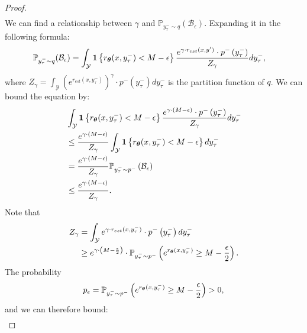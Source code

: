 \begin{proof}
\begin{equation*}
\begin{aligned}
\end{aligned}
\end{equation*}
We can find a relationship between $\gamma$ and $\mathbb{P}_{y^{-}_{\tau}\sim q}(\mathcal{B}_{\epsilon})$. Expanding it in the following formula:
\begin{equation*}
\begin{aligned}
&\mathbb{P}_{y^{-}_{\tau}\sim q}(\mathcal{B}_{\epsilon})=\int_{\mathcal{Y}}\mathbf{1}\left\{r_{{\boldsymbol{\theta}}}(x,y^{-}_{\tau})<M-\epsilon\right\}\frac{e^{{\gamma\cdot r_{est}(x,y')}}\cdot p^{-}\left(y^{-}_{\tau}\right)}{Z_{\gamma}}dy^{-}_{\tau},
\end{aligned}
\end{equation*}
where $Z_{\gamma}=\int_{\mathcal{Y}}\left(e^{{ r_{est}(x,y^{-}_{\tau})}}\right)^{\gamma}\cdot p^{-}\left(y^{-}_{\tau}\right)dy^{-}_{\tau}$ is the partition function of $q$. We can bound the equation by:
\begin{equation*}
\begin{aligned}
&\int_{\mathcal{Y}}\mathbf{1}\left\{r_{{\boldsymbol{\theta}}}(x,y^{-}_{\tau})<M-\epsilon\right\}\frac{e^{\gamma\cdot\left(M-\epsilon\right)}\cdot p^{-}\left(y^{-}_{\tau}\right)}{Z_{\gamma}}dy^{-}_{\tau} \\
&\leq \frac{e^{\gamma\cdot\left(M-\epsilon\right)}}{Z_{\gamma}}\int_{\mathcal{Y}}\mathbf{1}\left\{r_{{\boldsymbol{\theta}}}(x,y^{-}_{\tau})<M-\epsilon\right\}dy^{-}_{\tau} \\
&=\frac{e^{\gamma\cdot\left(M-\epsilon\right)}}{Z_{\gamma}}\mathbb{P}_{y^{-}_{\tau}\sim p^{-}}\left(\mathcal{B}_{\epsilon}\right) \\
& \leq \frac{e^{\gamma\cdot\left(M-\epsilon\right)}}{Z_{\gamma}}.
\end{aligned}
\end{equation*}
Note that
\begin{equation*}
\begin{aligned}
Z_{\gamma}&=\int_{\mathcal{Y}}e^{\gamma\cdot r_{est}(x,y^{-}_{\tau})}\cdot p^{-}\left(y^{-}_{\tau}\right)dy^{-}_{\tau} \\
&\geq e^{\gamma\cdot\left(M-\frac{\epsilon}{2}\right)}\cdot\mathbb{P}_{y^{-}_{\tau}\sim p^{-}}\left(e^{ r_{{\boldsymbol{\theta}}}(x,y^{-}_{\tau})}\geq M-\frac{\epsilon}{2}\right).
\end{aligned}
\end{equation*}
The probability \[p_{\epsilon}=\mathbb{P}_{y^{-}_{\tau}\sim p^{-}}\left(e^{ r_{{\boldsymbol{\theta}}}(x,y^{-}_{\tau})}\geq M-\frac{\epsilon}{2}\right)>0,\] 
and we can therefore bound:
\begin{equation*}
\begin{aligned}

\end{aligned}
\end{equation*}
\end{proof}
